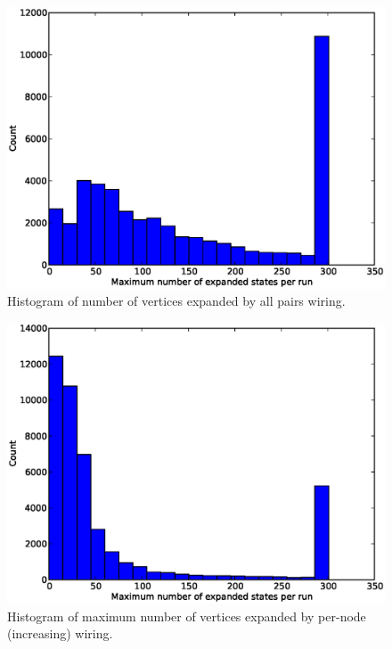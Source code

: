 \begin{figure}[H]
\begin{center}
\includegraphics[width=\textwidth]{Images/max_expanded_all_pairs.eps}
\caption[Number of vertices expanded by all pairs]{Histogram of number of
vertices expanded by all pairs wiring.}
\label{fig:max_expanded_all_pairs}
\end{center}
\end{figure}

\begin{figure}[H]
\begin{center}
\includegraphics[width=\textwidth]{Images/max_expanded_per_node_increasing.eps}
\caption[Number of vertices expanded by per-node (increasing)]{Histogram of
maximum number of vertices expanded by per-node (increasing) wiring.}
\label{fig:max_expanded_per_node_increasing}
\end{center}
\end{figure}

